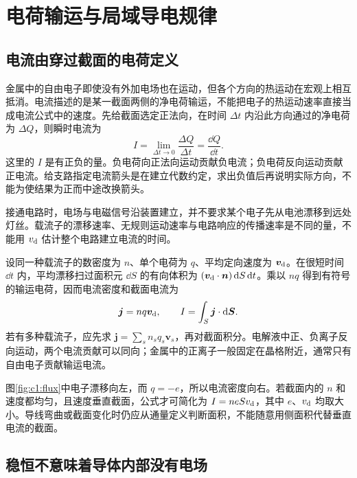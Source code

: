 \section{电荷输运与局域导电规律}
\subsection{电流由穿过截面的电荷定义}

金属中的自由电子即使没有外加电场也在运动，但各个方向的热运动在宏观上相互抵消。电流描述的是某一截面两侧的净电荷输运，不能把电子的热运动速率直接当成电流公式中的速度。先给截面选定正法向，在时间 $\Delta t$ 内沿此方向通过的净电荷为 $\Delta Q$，则瞬时电流为
\[
 I=\lim_{\Delta t\to0}\frac{\Delta Q}{\Delta t}=\frac{\dd Q}{\dd t}.
\]
这里的 $I$ 是有正负的量。负电荷向正法向运动贡献负电流；负电荷反向运动贡献正电流。给支路指定电流箭头是在建立代数约定，求出负值后再说明实际方向，不能为使结果为正而中途改换箭头。

接通电路时，电场与电磁信号沿装置建立，并不要求某个电子先从电池漂移到远处灯丝。载流子的漂移速率、无规则运动速率与电路响应的传播速率是不同的量，不能用 $v_{\rm d}$ 估计整个电路建立电流的时间。

设同一种载流子的数密度为 $n$、单个电荷为 $q$、平均定向速度为 $\bm v_{\rm d}$。在很短时间 $\dd t$ 内，平均漂移扫过面积元 $\dd S$ 的有向体积为 $(\bm v_{\rm d}\cdot\bm n)\mathop{}\!\mathrm d S\mathop{}\!\mathrm d t$。乘以 $nq$ 得到有符号的输运电荷，因而电流密度和截面电流为
\[
 \bm j=nq\bm v_{\rm d},\qquad I=\int_S\bm j\cdot\mathop{}\!\mathrm d\bm S.
\]
若有多种载流子，应先求 $\bm j=\sum_s n_s q_s\bm v_s$，再对截面积分。电解液中正、负离子反向运动，两个电流贡献可以同向；金属中的正离子一般固定在晶格附近，通常只有自由电子贡献输运电流。


图\ref{fig:c1:flux}中电子漂移向左，而 $q=-e$，所以电流密度向右。若截面内的 $n$ 和速度都均匀，且速度垂直截面，公式才可简化为 $I=neSv_{\rm d}$，其中 $e$、$v_{\rm d}$ 均取大小。导线弯曲或截面变化时仍应从通量定义判断面积，不能随意用侧面积代替垂直电流的截面。
\subsection{稳恒不意味着导体内部没有电场}

